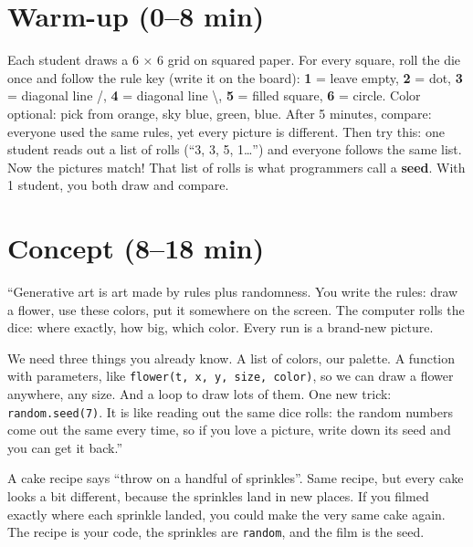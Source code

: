 \section{Warm-up (0--8 min)}
\begin{unplugged}
Each student draws a 6 × 6 grid on squared paper. For every square, roll the die once and follow
the rule key (write it on the board):
\textbf{1} = leave empty, \textbf{2} = dot, \textbf{3} = diagonal line /, \textbf{4} = diagonal line \textbackslash,
\textbf{5} = filled square, \textbf{6} = circle. Color optional: pick from orange, sky blue, green, blue.
After 5 minutes, compare: everyone used the same rules, yet every picture is different.
Then try this: one student reads out a list of rolls (\enquote{3, 3, 5, 1…}) and everyone follows the
same list. Now the pictures match! That list of rolls is what programmers call a \textbf{seed}.
With 1 student, you both draw and compare.
\end{unplugged}

\section{Concept (8--18 min)}
\begin{teacherscript}
“Generative art is art made by rules plus randomness. You write the rules: draw a flower, use these
colors, put it somewhere on the screen. The computer rolls the dice: where exactly, how big, which
color. Every run is a brand-new picture.

We need three things you already know. A list of colors, our palette. A function with parameters,
like \texttt{flower(t, x, y, size, color)}, so we can draw a flower anywhere, any size. And a loop to
draw lots of them. One new trick: \texttt{random.seed(7)}. It is like reading out the same dice rolls:
the random numbers come out the same every time, so if you love a picture, write down its seed and
you can get it back.”
\end{teacherscript}

\begin{analogy}
A cake recipe says \enquote{throw on a handful of sprinkles}. Same recipe, but every cake looks a
bit different, because the sprinkles land in new places. If you filmed exactly where each sprinkle
landed, you could make the very same cake again. The recipe is your code, the sprinkles are
\texttt{random}, and the film is the seed.
\end{analogy}

